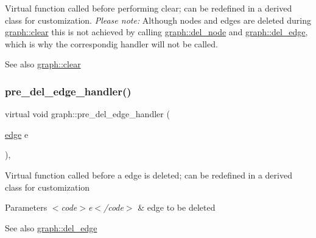 Virtual function called before performing clear; can be redefined in a derived class for customization. {\itshape Please note\+:} Although nodes and edges are deleted during \mbox{\hyperlink{classgraph_a9ff5d6af3653e79f87b836701453f55a}{graph\+::clear}} this is not achieved by calling \mbox{\hyperlink{classgraph_a8bdc09d5b9ac4bd26586b054d8fcbe91}{graph\+::del\+\_\+node}} and \mbox{\hyperlink{classgraph_ad9356508c49c542dfd4b7169297387c6}{graph\+::del\+\_\+edge}}, which is why the correspondig handler will not be called.

\begin{DoxySeeAlso}{See also}
\mbox{\hyperlink{classgraph_a9ff5d6af3653e79f87b836701453f55a}{graph\+::clear}} 
\end{DoxySeeAlso}
\mbox{\label{classgraph_a413590984a00770927ba619c409a7b57}} 
\subsubsection{\texorpdfstring{pre\+\_\+del\+\_\+edge\+\_\+handler()}{pre\_del\_edge\_handler()}}
{\footnotesize\ttfamily virtual void graph\+::pre\+\_\+del\+\_\+edge\+\_\+handler (\begin{DoxyParamCaption}\item[{\mbox{\hyperlink{classedge}{edge}}}]{e }\end{DoxyParamCaption})\hspace{0.3cm}{\ttfamily [inline]}, {\ttfamily [virtual]}}

Virtual function called before a edge is deleted; can be redefined in a derived class for customization


\begin{DoxyParams}{Parameters}
{\em $<$code$>$e$<$/code$>$} & edge to be deleted \\
\hline
\end{DoxyParams}
\begin{DoxySeeAlso}{See also}
\mbox{\hyperlink{classgraph_ad9356508c49c542dfd4b7169297387c6}{graph\+::del\+\_\+edge}} 
\end{DoxySeeAlso}
\mbox{\label{classgraph_a06f8fe6d5ee6bef9066f78a0b95c083a}} 
